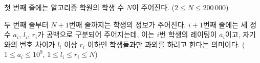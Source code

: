첫 번째 줄에는 알고리즘 학원의 학생 수 $N$이 주어진다. ($2 \le N \le 200\,000$)

두 번째 줄부터 $N+1$번째 줄까지는 학생의 정보가 주어진다. $i+1$번째 줄에는 세 정수 $a_i$, $l_i$, $r_i$가 공백으로 구분되어 주어지는데, 이는 $i$번 학생의 레이팅이 $a_i$이고, 자기와의 번호 차이가 $l_i$ 이상 $r_i$ 이하인 학생들과만 과외를 하려고 한다는 의미이다. ($1 \le a_i \le 10^9$, $1 \le l_i \le r_i \le N$)